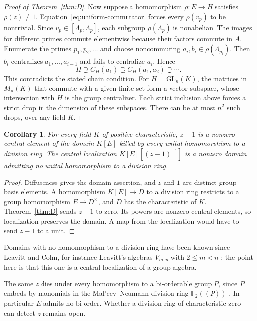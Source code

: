 \documentclass[11pt,a4paper]{article}
\newtheorem{corollary}[theorem]{Corollary}
\numberwithin{equation}{section}
\newcommand{\F}{\mathbb F}
\begin{document}
\begin{proof}[Proof of Theorem~\ref{thm:D}]
Now suppose a homomorphism \(\rho:E\to H\) satisfies \(\rho(z)\ne1\). Equation~\eqref{eq:uniform-commutator} forces every \(\rho(v_p)\) to be nontrivial. Since \(v_p\in[\Lambda_p,\Lambda_p]\), each subgroup \(\rho(\Lambda_p)\) is nonabelian. The images for different primes commute elementwise because their factors commute in \(A\). Enumerate the primes \(p_1,p_2,\ldots\) and choose noncommuting \(a_i,b_i\in\rho(\Lambda_{p_i})\). Then \(b_i\) centralizes \(a_1,\ldots,a_{i-1}\) and fails to centralize \(a_i\). Hence
\[
 H\supsetneq C_H(a_1)\supsetneq C_H(a_1,a_2)\supsetneq\cdots .
\]
This contradicts the stated chain condition. For \(H=\mathrm{GL}_n(K)\), the matrices in \(M_n(K)\) that commute with a given finite set form a vector subspace, whose intersection with \(H\) is the group centralizer. Each strict inclusion above forces a strict drop in the dimension of these subspaces. There can be at most \(n^2\) such drops, over any field \(K\).
\end{proof}

\begin{corollary}\label{cor:uniform-localization}
For every field \(K\) of positive characteristic, \(z-1\) is a nonzero central element of the domain \(K[E]\) killed by every unital homomorphism to a division ring. The central localization \(K[E][(z-1)^{-1}]\) is a nonzero domain admitting no unital homomorphism to a division ring.
\end{corollary}
\begin{proof}
Diffuseness gives the domain assertion, and \(z\) and \(1\) are distinct group basis elements. A homomorphism \(K[E]\to D\) to a division ring restricts to a group homomorphism \(E\to D^\times\), and \(D\) has the characteristic of \(K\). Theorem~\ref{thm:D} sends \(z-1\) to zero. Its powers are nonzero central elements, so localization preserves the domain. A map from the localization would have to send \(z-1\) to a unit.
\end{proof}

Domains with no homomorphism to a division ring have been known since Leavitt and Cohn, for instance Leavitt's algebras \(V_{m,n}\) with \(2\le m<n\) \cite[Theorem~6.1 and Example~6.3]{Bergman74}; the point here is that this one is a central localization of a group algebra.

The same \(z\) dies under every homomorphism to a bi-orderable group \(P\), since \(P\) embeds by monomials in the Mal'cev--Neumann division ring \(\F_2((P))\) \cite{Neumann}\cite[Section~1]{r1}. In particular \(E\) admits no bi-order. Whether a division ring of characteristic zero can detect \(z\) remains open.
\end{document}
